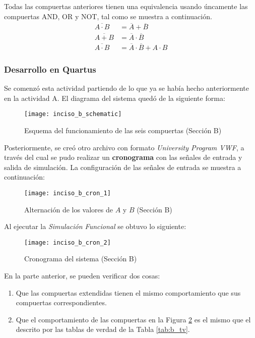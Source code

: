 \documentclass[../procedimientos.tex]{subfiles}
\begin{document}
Todas las compuertas anteriores tienen una equivalencia usando úncamente las 
compuertas AND, OR y NOT, tal como se muestra a continuación.
\begin{align}
  \overline{A \cdot B} &= \overline{A} + \overline{B}\\
  \overline{A + B} &= \overline{A} \cdot \overline{B}\\
  \overline{A \cdot B} &= \overline{A} \cdot \overline{B} + A \cdot B
\end{align}

\subsubsection{Desarrollo en Quartus}
Se comenzó esta actividad partiendo de lo que ya se había hecho anteriormente 
en la actividad A. El diagrama del sistema quedó de la siguiente forma:
\begin{figure}[H]
  \centering
  \texttt{[image: inciso\_b\_schematic]}
  \caption{Esquema del funcionamiento de las seis compuertas (Sección B)}
\end{figure}

Posteriormente, se creó otro archivo con formato \textit{University Program 
VWF}, a través del cual se pudo realizar un \textbf{cronograma} con las 
señales de entrada y salida de simulación. La configuración de las señales de 
entrada se muestra a continuación:
\begin{figure}[H]
  \centering
  \texttt{[image: inciso\_b\_cron\_1]}
  \caption{Alternación de los valores de $A$ y $B$ (Sección B)}
  \label{fig:variables_cron_b}
\end{figure}

Al ejecutar la \textit{Simulación Funcional} se obtuvo lo siguiente:
\begin{figure}[H]
  \centering
  \texttt{[image: inciso\_b\_cron\_2]}
  \caption{Cronograma del sistema (Sección B)}
  \label{fig:cron_b}
\end{figure}

En la parte anterior, se pueden verificar dos cosas:
\begin{enumerate}
  \item Que las compuertas extendidas tienen el mismo comportamiento que sus 
    compuertas correspondientes.
  \item Que el comportamiento de las compuertas en la Figura \ref{fig:cron_b} 
    es el mismo que el descrito por las tablas de verdad de la Tabla 
    \ref{tab:b_tv}.
\end{enumerate}

\newpage
\end{document}
